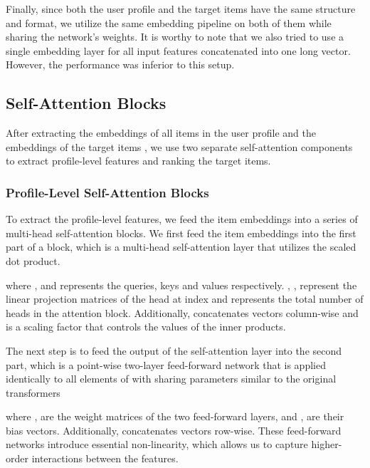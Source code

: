\documentclass[sigconf,natbib=true]{acmart}
\begin{document}
Finally, since both the user profile  and the target items  have the same structure and format, we utilize the same embedding pipeline on both of them while sharing the network's weights. It is worthy to note that we also tried to use a single embedding layer for all input features concatenated into one long vector. However, the performance was inferior to this setup. 


\subsection{Self-Attention Blocks}

After extracting the embeddings of all items in the user profile  and the embeddings of the target items , we use two separate self-attention components to extract profile-level features and ranking the target items.


\subsubsection{Profile-Level Self-Attention Blocks}
To extract the profile-level features, we feed the item embeddings  into a series of multi-head self-attention blocks. We first feed the item embeddings into the first part of a block, which is a multi-head self-attention layer that utilizes the scaled dot product. \cite{vaswani2017attention}

 

 



\noindent where ,  and  represents the queries, keys and values respectively. , ,  represent the linear projection matrices of the head at index  and  represents the total number of heads in the attention block. Additionally,  concatenates vectors column-wise and  is a scaling factor that controls the values of the inner products. 

The next step is to feed the output of the self-attention layer into the second part, which is a point-wise two-layer feed-forward network that is applied identically to all elements  of  with sharing parameters similar to the original transformers \cite{vaswani2017attention}

 


\noindent where ,  are the weight matrices of the two feed-forward layers, and ,  are their bias vectors. Additionally,  concatenates vectors row-wise. These feed-forward networks introduce essential non-linearity, which allows us to capture higher-order interactions between the features.
\end{document}
